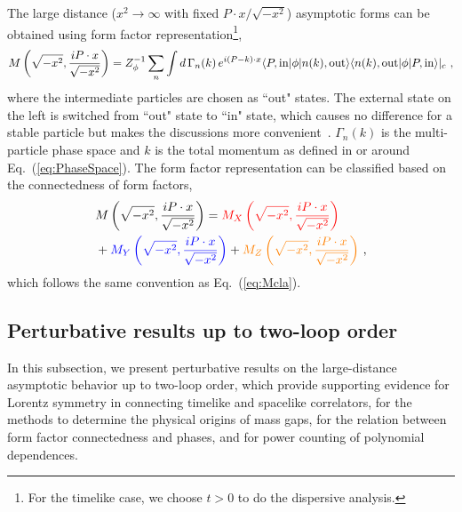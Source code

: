 \documentclass[a4paper,11pt]{article}
\begin{document}
The large distance ($x^2 \rightarrow \infty$ with fixed $P\cdot x/\sqrt{-x^2}$) asymptotic forms can be obtained using form factor representation\footnote{For the timelike case, we choose $t>0$ to do the dispersive analysis.},
\begin{align}\label{eq:Mdisphi3}
M\left(\sqrt{-x^2}, \frac{i P\cdot x}{\sqrt{-x^2}}\right) = Z^{-1}_{\phi} \sum_{n} \int d \, \Gamma_n(k) \, e^{i (P - k) \cdot x} \langle P, {\rm in} | \phi | n(k), {\rm out} \rangle \langle n(k), {\rm out} | \phi | P, {\rm in} \rangle |_{c} \ ,
\end{align}
where the intermediate particles are chosen as ``out" states. The external state on the left is switched from ``out" state to ``in" state, which causes no difference for a stable particle but makes the discussions more convenient~\cite{Collins_2023}. $\Gamma_n(k)$ is the multi-particle phase space and $k$ is the total momentum as defined in or around Eq.~(\ref{eq:PhaseSpace}). The form factor representation can be classified based on the connectedness of form factors,
\begin{align}\label{eq:Mclaphi3}
&M\left(\sqrt{-x^2}, \frac{i P\cdot x}{\sqrt{-x^2}}\right) 
= 
{\color{red} M_{X}\left(\sqrt{-x^2}, \frac{i P\cdot x}{\sqrt{-x^2}}\right)} \nonumber\\
&+ {\color{blue} M_{Y}\left(\sqrt{-x^2}, \frac{i P\cdot x}{\sqrt{-x^2}}\right)} 
+ {\color{orange} M_{Z}\left(\sqrt{-x^2}, \frac{i P\cdot x}{\sqrt{-x^2}}\right)} \ ,
\end{align}
which follows the same convention as Eq.~(\ref{eq:Mcla}).



\subsection{Perturbative results up to two-loop order}\label{sec:phi3pert}
In this subsection, we present perturbative results on the large-distance asymptotic behavior up to two-loop order, which provide supporting evidence for Lorentz symmetry in connecting timelike and spacelike correlators, for the methods to determine the physical origins of mass gaps, for the relation between form factor connectedness and phases, and for power counting of polynomial dependences.
\end{document}
